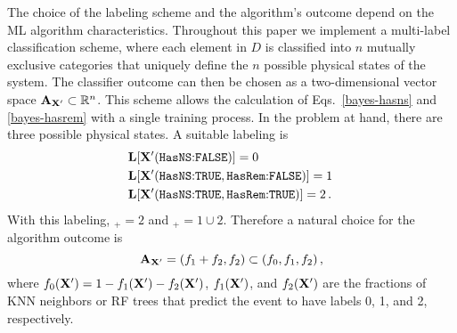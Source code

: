 The choice of the labeling scheme and the algorithm's outcome depend on the \ac{ML} algorithm characteristics. Throughout this paper we implement a multi-label classification scheme, where each
element in $D$ is classified into $n$ mutually exclusive categories that uniquely define the $n$ possible physical states of the system. The classifier outcome can then be chosen as a
two-dimensional vector space ${\bf A}_{{\bf X}'}\subset \mathbb{R}^n$. This scheme allows the calculation of Eqs.~\eqref{bayes-hasns} and \eqref{bayes-hasrem} with a single training process. In
the problem at hand, there are three possible physical states. A suitable labeling is
%
\begin{align}
&{\bf L}[{\bf X}'(\hbox{{{\tt HasNS}}:{{\tt FALSE}}})]=0\,\nonumber\\
&{\bf L}[{\bf X}'(\hbox{{{\tt HasNS}}:{{\tt TRUE}}},\hbox{{{\tt HasRem}}:{{\tt FALSE}}})]=1\,\\
&{\bf L}[{\bf X}'(\hbox{{{\tt HasNS}}:{{\tt TRUE}}},\hbox{{{\tt HasRem}}:{{\tt TRUE}}})]=2\,.\nonumber
\end{align}
%
With this labeling, \hasrem$_+=2$ and \hasns$_+=1\cup 2$. Therefore a natural choice for the algorithm outcome is
%
\begin{equation}
{\bf A}_{\bf X'}=(f_1+f_2,f_2)\subset (f_0,f_1,f_2)\,,
\end{equation}
%
where $f_0({\bf X}')=1-f_1({\bf X}')-f_2({\bf X}')$, $f_1({\bf X}')$, and $f_2({\bf X}')$ are the fractions of \ac{KNN} neighbors or \ac{RF} trees that predict the event to
have labels 0, 1, and 2, respectively.

%
%

